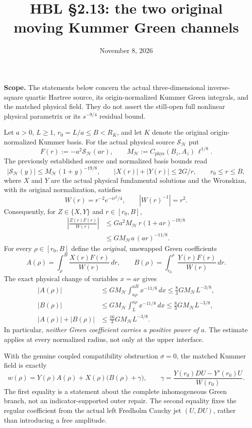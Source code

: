 \documentclass[11pt]{amsart}
\newcommand{\HH}{\mathcal H}
\begin{document}
\title{HBL \S2.13: the two original moving Kummer Green channels}
\date{November 8, 2026}
\maketitle

\noindent\textbf{Scope.}
The statements below concern the actual three-dimensional inverse-square
quartic Hartree source, its origin-normalized Kummer Green integrals,
and the matched physical field.  They do not assert the still-open
full nonlinear physical parametrix or its $s^{-9/4}$ residual bound.

Let $a>0$, $L\ge 1$, $r_0=L/a\le B<R_K$,
and let $K$ denote the original origin-normalized Kummer basis.
For the actual physical source $\mathcal S_\HH$ put
\[
 F(r):=-a^2\mathcal S_\HH(ar),\qquad
 M_\HH:=C_{\mathrm{phys}}(B_z,A_z)\,\ell^{1/8}.
\]
The previously established source and normalized basis bounds read
\[
 |\mathcal S_\HH(y)|\le M_\HH(1+y)^{-19/8},\qquad
 |X(r)|+|Y(r)|\le 2G/r,\qquad r_0\le r\le B,
\]
where $X$ and $Y$ are the actual physical fundamental solutions
and the Wronskian, with its original normalization, satisfies
\[
 W(r)=r^{-2}e^{-ir^2/4},\qquad |W(r)^{-1}|=r^2.
\]
Consequently, for $Z\in\{X,Y\}$ and $r\in[r_0,B]$,
\begin{align*}
 \left|\frac{Z(r)F(r)}{W(r)}\right|
 &\le G a^2 M_\HH\,r(1+ar)^{-19/8}\\
 &\le G M_\HH a\,(ar)^{-11/8}.
\end{align*}
For every $\rho\in[r_0,B]$ define the \emph{original}, unswapped
Green coefficients
\[
 A(\rho)=\int_\rho^B\frac{X(r)F(r)}{W(r)}\,dr,\qquad
 B(\rho)=\int_{r_0}^{\rho}\frac{Y(r)F(r)}{W(r)}\,dr.
\]
The exact physical change of variables $x=ar$ gives
\begin{align*}
 |A(\rho)|
 &\le GM_\HH\int_{a\rho}^{aB}x^{-11/8}\,dx
 \le \frac83 GM_\HH L^{-3/8},\\
 |B(\rho)|
 &\le GM_\HH\int_L^{a\rho}x^{-11/8}\,dx
 \le \frac83 GM_\HH L^{-3/8},\\
 |A(\rho)|+|B(\rho)|
 &\le \frac{16}{3}GM_\HH L^{-3/8}.
\end{align*}
In particular, \emph{neither Green coefficient carries a positive
power of $a$}.  The estimate applies at every normalized radius,
not only at the upper interface.

With the genuine coupled compatibility obstruction $\sigma=0$,
the matched Kummer field is exactly
\[
 w(\rho)=Y(\rho)A(\rho)+X(\rho)\bigl(B(\rho)+\gamma\bigr),
 \qquad
 \gamma=\frac{Y(r_0)DU-Y'(r_0)U}{W(r_0)}.
\]
The first equality is a statement about the complete inhomogeneous
Green branch, not an indicator-supported outer repair.  The second
equality fixes the regular coefficient from the actual left Fredholm
Cauchy jet $(U,DU)$, rather than introducing a free amplitude.
\end{document}
